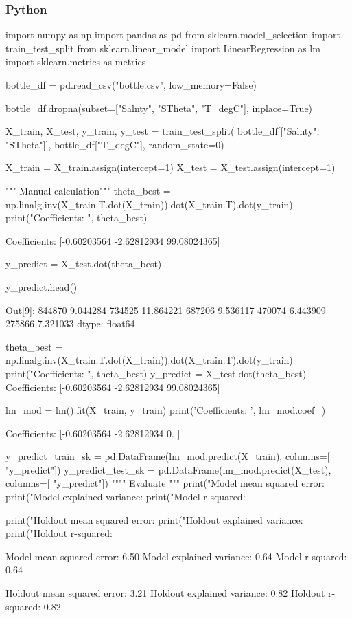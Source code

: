 \documentclass{article}
\begin{document}
\subsubsection*{Python}
\begin{python}
import numpy as np
import pandas as pd
from sklearn.model_selection import train_test_split
from sklearn.linear_model import LinearRegression as lm
import sklearn.metrics as metrics

bottle_df = pd.read_csv("bottle.csv", low_memory=False)

bottle_df.dropna(subset=["Salnty", "STheta", "T_degC"], inplace=True)

X_train, X_test, y_train, y_test = train_test_split(
    bottle_df[["Salnty", "STheta"]],
    bottle_df["T_degC"],
    random_state=0)

X_train = X_train.assign(intercept=1)
X_test = X_test.assign(intercept=1)

""" Manual calculation"""
theta_best = np.linalg.inv(X_train.T.dot(X_train)).dot(X_train.T).dot(y_train)
print("Coefficients: ", theta_best)

Coefficients:  [-0.60203564 -2.62812934 99.08024365]

y_predict = X_test.dot(theta_best)

y_predict.head()

Out[9]: 
844870     9.044284
734525    11.864221
687206     9.536117
470074     6.443909
275866     7.321033
dtype: float64

theta_best = np.linalg.inv(X_train.T.dot(X_train)).dot(X_train.T).dot(y_train)
print("Coefficients: ", theta_best)
y_predict = X_test.dot(theta_best)
Coefficients:  [-0.60203564 -2.62812934 99.08024365]

lm_mod = lm().fit(X_train, y_train)
print('Coefficients: \n', lm_mod.coef_)

Coefficients: 
 [-0.60203564 -2.62812934  0.        ]

y_predict_train_sk = pd.DataFrame(lm_mod.predict(X_train), columns=[
    "y_predict"])
y_predict_test_sk = pd.DataFrame(lm_mod.predict(X_test), columns=[
    "y_predict"])
"""" Evaluate """
print("Model mean squared error: %
print("Model explained variance: %
print("Model r-squared: %

print("Holdout mean squared error: %
print("Holdout explained variance: %
print("Holdout r-squared: %

Model mean squared error: 6.50
Model explained variance: 0.64
Model r-squared: 0.64

Holdout mean squared error: 3.21
Holdout explained variance: 0.82
Holdout r-squared: 0.82
\end{python}
\end{document}
